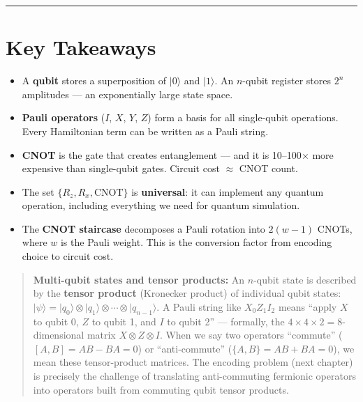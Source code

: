 \documentclass[
  11pt,
  oneside]{book}
\providecommand{\tightlist}{%
  \setlength{\itemsep}{0pt}\setlength{\parskip}{0pt}}
\begin{document}
\begin{center}\rule{0.5\linewidth}{0.5pt}\end{center}

\section{Key Takeaways}\label{key-takeaways-3}

\begin{itemize}
\tightlist
\item
  A \textbf{qubit} stores a superposition of \(\lvert 0\rangle\) and
  \(\lvert 1\rangle\). An \(n\)-qubit register stores \(2^n\) amplitudes
  --- an exponentially large state space.
\item
  \textbf{Pauli operators} (\(I\), \(X\), \(Y\), \(Z\)) form a basis for
  all single-qubit operations. Every Hamiltonian term can be written as
  a Pauli string.
\item
  \textbf{CNOT} is the gate that creates entanglement --- and it is
  10--100$\times$ more expensive than single-qubit gates. Circuit cost $\approx$ CNOT
  count.
\item
  The set \(\{R_z, R_x, \text{CNOT}\}\) is \textbf{universal}: it can
  implement any quantum operation, including everything we need for
  quantum simulation.
\item
  The \textbf{CNOT staircase} decomposes a Pauli rotation into
  \(2(w-1)\) CNOTs, where \(w\) is the Pauli weight. This is the
  conversion factor from encoding choice to circuit cost.
\end{itemize}

\begin{quote}
\textbf{Multi-qubit states and tensor products:} An \(n\)-qubit state is
described by the \textbf{tensor product} (Kronecker product) of
individual qubit states:
\(\lvert\psi\rangle = \lvert q_0\rangle \otimes \lvert q_1\rangle \otimes \cdots \otimes \lvert q_{n-1}\rangle\).
A Pauli string like \(X_0 Z_1 I_2\) means ``apply \(X\) to qubit 0,
\(Z\) to qubit 1, and \(I\) to qubit 2'' --- formally, the
\(4 \times 4 \times 2 = 8\)-dimensional matrix
\(X \otimes Z \otimes I\). When we say two operators ``commute''
(\([A, B] = AB - BA = 0\)) or ``anti-commute''
(\(\{A, B\} = AB + BA = 0\)), we mean these tensor-product matrices. The
encoding problem (next chapter) is precisely the challenge of
translating anti-commuting fermionic operators into operators built from
commuting qubit tensor products.
\end{quote}
\end{document}

